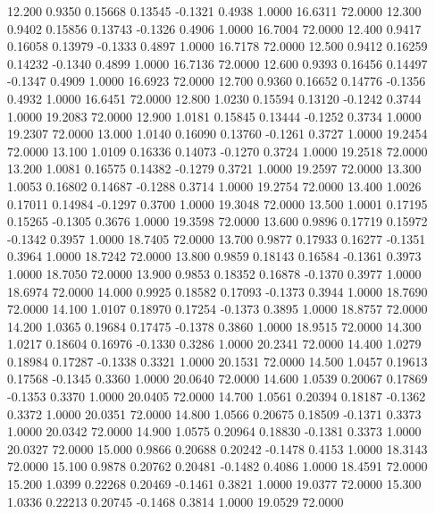   12.200   0.9350   0.15668   0.13545  -0.1321   0.4938   1.0000  16.6311  72.0000
  12.300   0.9402   0.15856   0.13743  -0.1326   0.4906   1.0000  16.7004  72.0000
  12.400   0.9417   0.16058   0.13979  -0.1333   0.4897   1.0000  16.7178  72.0000
  12.500   0.9412   0.16259   0.14232  -0.1340   0.4899   1.0000  16.7136  72.0000
  12.600   0.9393   0.16456   0.14497  -0.1347   0.4909   1.0000  16.6923  72.0000
  12.700   0.9360   0.16652   0.14776  -0.1356   0.4932   1.0000  16.6451  72.0000
  12.800   1.0230   0.15594   0.13120  -0.1242   0.3744   1.0000  19.2083  72.0000
  12.900   1.0181   0.15845   0.13444  -0.1252   0.3734   1.0000  19.2307  72.0000
  13.000   1.0140   0.16090   0.13760  -0.1261   0.3727   1.0000  19.2454  72.0000
  13.100   1.0109   0.16336   0.14073  -0.1270   0.3724   1.0000  19.2518  72.0000
  13.200   1.0081   0.16575   0.14382  -0.1279   0.3721   1.0000  19.2597  72.0000
  13.300   1.0053   0.16802   0.14687  -0.1288   0.3714   1.0000  19.2754  72.0000
  13.400   1.0026   0.17011   0.14984  -0.1297   0.3700   1.0000  19.3048  72.0000
  13.500   1.0001   0.17195   0.15265  -0.1305   0.3676   1.0000  19.3598  72.0000
  13.600   0.9896   0.17719   0.15972  -0.1342   0.3957   1.0000  18.7405  72.0000
  13.700   0.9877   0.17933   0.16277  -0.1351   0.3964   1.0000  18.7242  72.0000
  13.800   0.9859   0.18143   0.16584  -0.1361   0.3973   1.0000  18.7050  72.0000
  13.900   0.9853   0.18352   0.16878  -0.1370   0.3977   1.0000  18.6974  72.0000
  14.000   0.9925   0.18582   0.17093  -0.1373   0.3944   1.0000  18.7690  72.0000
  14.100   1.0107   0.18970   0.17254  -0.1373   0.3895   1.0000  18.8757  72.0000
  14.200   1.0365   0.19684   0.17475  -0.1378   0.3860   1.0000  18.9515  72.0000
  14.300   1.0217   0.18604   0.16976  -0.1330   0.3286   1.0000  20.2341  72.0000
  14.400   1.0279   0.18984   0.17287  -0.1338   0.3321   1.0000  20.1531  72.0000
  14.500   1.0457   0.19613   0.17568  -0.1345   0.3360   1.0000  20.0640  72.0000
  14.600   1.0539   0.20067   0.17869  -0.1353   0.3370   1.0000  20.0405  72.0000
  14.700   1.0561   0.20394   0.18187  -0.1362   0.3372   1.0000  20.0351  72.0000
  14.800   1.0566   0.20675   0.18509  -0.1371   0.3373   1.0000  20.0342  72.0000
  14.900   1.0575   0.20964   0.18830  -0.1381   0.3373   1.0000  20.0327  72.0000
  15.000   0.9866   0.20688   0.20242  -0.1478   0.4153   1.0000  18.3143  72.0000
  15.100   0.9878   0.20762   0.20481  -0.1482   0.4086   1.0000  18.4591  72.0000
  15.200   1.0399   0.22268   0.20469  -0.1461   0.3821   1.0000  19.0377  72.0000
  15.300   1.0336   0.22213   0.20745  -0.1468   0.3814   1.0000  19.0529  72.0000

